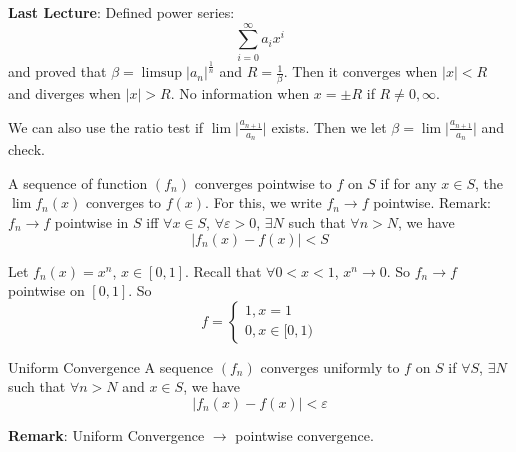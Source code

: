 \documentclass{report}
\begin{document}
\textbf{Last Lecture}: Defined power series:
    \begin{equation*}
        \sum_{i = 0}^{\infty} a_{i}x^{i}
    \end{equation*}
and proved that $\beta = \limsup \lvert a_{n} \rvert^{\frac{1}{n}}$ and $R = \frac{1}{\beta}$. Then it converges when $\lvert x \rvert < R$ and diverges when $\lvert x \rvert > R$. No information when $x = \pm R$ if $R \neq 0, \infty$.

We can also use the ratio test if $\lim \lvert \frac{a_{n + 1}}{a_{n}} \rvert$ exists. Then we let $\beta = \lim \lvert \frac{a_{n + 1}}{a_{n}} \rvert$ and check.

A sequence of function $(f_{n})$ converges pointwise to $f$ on $S$ if for any $x \in S$, the $\lim f_{n}(x)$ converges to $f(x)$. For this, we write $f_{n} \rightarrow f$ pointwise. Remark: $f_{n} \rightarrow f$ pointwise in $S$ iff $\forall  x \in S$, $\forall \varepsilon>0$, $\exists N$ such that $\forall  n > N$, we have
    \begin{equation*}
        \lvert f_{n}(x) - f(x) \rvert < S
    \end{equation*}

\begin{examples}
    \begin{example}
        Let $f_{n}(x) = x^{n}$, $x \in[0, 1]$. Recall that $\forall 0 < x <1$, $x^{n} \rightarrow0$. So $f_{n} \rightarrow f$ pointwise on $[0, 1]$. So
            \begin{equation*}
                f = \begin{cases}
                    1, x = 1 \\
                    0, x \in[0, 1)
                \end{cases}
            \end{equation*}
    \end{example}
\end{examples}

\begin{definition}{Uniform Convergence}
    A sequence $(f_{n})$ converges uniformly to $f$ on $S$ if $\forall  S$, $\exists  N$ such that $\forall  n > N$ and $x \in S$, we have 
        \begin{equation*}
            \lvert f_{n}(x) - f(x) \rvert <\varepsilon
        \end{equation*}
\end{definition}

\textbf{Remark}: Uniform Convergence $\rightarrow$ pointwise convergence.
\end{document}

